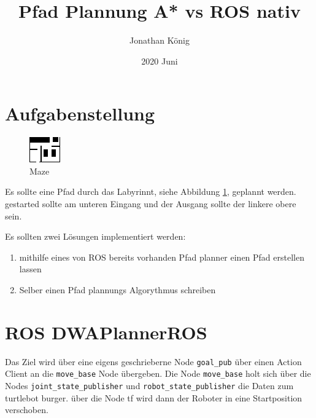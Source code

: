 \documentclass{article}
\title{Pfad Plannung A* vs ROS nativ}
\date{2020 Juni}
\author{Jonathan König}
\begin{document}
\maketitle
\newpage

\tableofcontents

\newpage
\clearpage
{}



\section{Aufgabenstellung}

\begin{figure}[!htbp]
    \centering
    \includegraphics[width=0.5\linewidth]{../src/koenig/maps/bmrMap.png}
    \caption{Maze}\label{map}
\end{figure}

Es sollte eine Pfad durch das Labyrinnt, siehe Abbildung \ref{map}, geplannt werden.
gestarted sollte am unteren Eingang und der Ausgang sollte der linkere obere sein.

Es sollten zwei Lösungen implementiert werden:
\begin{enumerate}
    \item mithilfe eines von ROS bereits vorhanden Pfad planner einen Pfad erstellen lassen
    \item Selber einen Pfad plannungs Algorythmus schreiben 
\end{enumerate}

\section{ROS DWAPlannerROS}
\label{DWAPlannerROS}

Das Ziel wird über eine eigens geschrieberne Node \verb|goal_pub| über einen Action Client an die \verb|move_base| Node übergeben.
Die Node \verb|move_base| holt sich über die Nodes \verb|joint_state_publisher| und \verb|robot_state_publisher| die Daten zum turtlebot burger.
über die Node tf wird dann der Roboter in eine Startposition verschoben.
\end{document}
